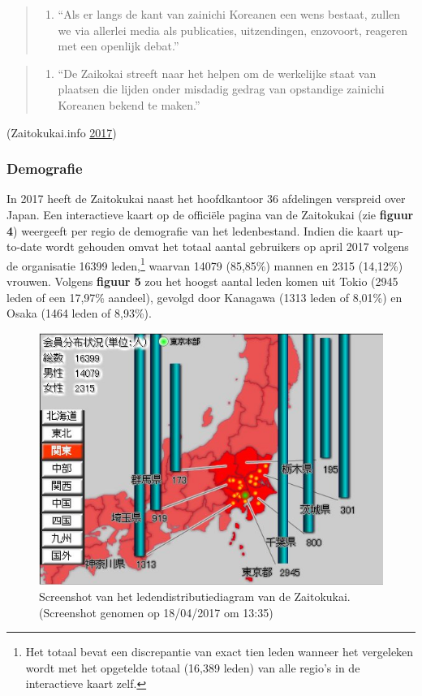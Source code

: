 \documentclass[10.5pt,dutch,]{article}
\providecommand{\tightlist}{%
  \setlength{\itemsep}{0pt}\setlength{\parskip}{0pt}}
\begin{document}
\begin{quote}
\begin{enumerate}
\def\labelenumi{\arabic{enumi}.}
\setcounter{enumi}{5}
\tightlist
\item
  ``Als er langs de kant van zainichi Koreanen een wens bestaat, zullen
  we via allerlei media als publicaties, uitzendingen, enzovoort,
  reageren met een openlijk debat.''
\end{enumerate}
\end{quote}

\begin{quote}
\begin{enumerate}
\def\labelenumi{\arabic{enumi}.}
\setcounter{enumi}{6}
\tightlist
\item
  ``De Zaikokai streeft naar het helpen om de werkelijke staat van
  plaatsen die lijden onder misdadig gedrag van opstandige zainichi
  Koreanen bekend te maken.''
\end{enumerate}
\end{quote}

(Zaitokukai.info
\protect\hyperlink{ref-zaitokukai.infoux5fzaitokukaiux5f2017}{2017})

\subsubsection{Demografie}\label{demografie}

In 2017 heeft de Zaitokukai naast het hoofdkantoor 36 afdelingen
verspreid over Japan. Een interactieve kaart op de officiële pagina van
de Zaitokukai (zie \textbf{figuur 4}) weergeeft per regio de demografie
van het ledenbestand. Indien die kaart up-to-date wordt gehouden omvat
het totaal aantal gebruikers op april 2017 volgens de organisatie 16399
leden,\footnote{Het totaal bevat een discrepantie van exact tien leden
  wanneer het vergeleken wordt met het opgetelde totaal (16,389 leden)
  van alle regio's in de interactieve kaart zelf.} waarvan 14079
(85,85\%) mannen en 2315 (14,12\%) vrouwen. Volgens \textbf{figuur 5}
zou het hoogst aantal leden komen uit Tokio (2945 leden of een 17,97\%
aandeel), gevolgd door Kanagawa (1313 leden of 8,01\%) en Osaka (1464
leden of 8,93\%).

\begin{figure}[!htb]
  \centering
    \includegraphics[width=.8\textwidth]{images/zaitokukai_user_base.jpg}
    \caption{Screenshot van het ledendistributiediagram van de Zaitokukai. (Screenshot genomen op 18/04/2017 om 13:35)}
\end{figure}
\end{document}
